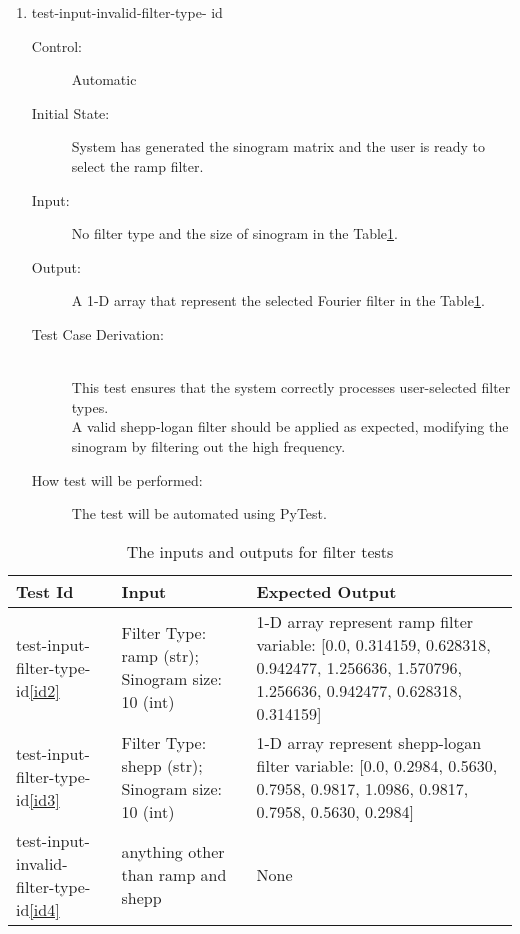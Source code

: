 \documentclass[12pt, titlepage]{article}
\newcounter{testnum}
\newcommand{\dthetestnum}{id\thetestnum}
\begin{document}
\begin{enumerate}
\item{test-input-invalid-filter-type- \label{id4} \dthetestnum}
\begin{description}
\item[Control:] Automatic


\item[Initial State:] System has generated the sinogram matrix and the user is
  ready to select the ramp filter.

\item[Input:] No filter type and the size of sinogram in the Table\ref{TableA}.

\item[Output:] A 1-D array that represent the selected Fourier filter in the Table\ref{TableA}.

\item[Test Case Derivation:] \hfill \\
  This test ensures that the system correctly processes
  user-selected filter types.\\
  A valid shepp-logan filter should be applied as expected, modifying the
  sinogram by filtering out the high frequency.

\item[How test will be performed:] The test will be automated using PyTest.
\end{description}
\end{enumerate}

\begin{table}[H]
  \centering
  \begin{tabularx}{\linewidth}{|X|X|X|}
    \hline
    Test Id                                  & Input                                            & Expected Output                                                                                                                             \\
    \hline
    test-input-filter-type-id\ref{id2}         & Filter Type: ramp (str); Sinogram size: 10 (int)  & 1-D array represent ramp filter variable: [0.0, 0.314159, 0.628318, 0.942477, 1.256636, 1.570796, 1.256636, 0.942477, 0.628318, 0.314159] \\ \hline
    test-input-filter-type-id\ref{id3}         & Filter Type: shepp (str); Sinogram size: 10 (int) & 1-D array represent shepp-logan filter variable: [0.0, 0.2984, 0.5630, 0.7958, 0.9817, 1.0986, 0.9817, 0.7958, 0.5630, 0.2984]            \\ \hline
    test-input-invalid-filter-type-id\ref{id4} & anything other than ramp and shepp               & None                                                                                                                                        \\ \hline
  \end{tabularx}
  \caption{The inputs and outputs for filter tests}
  \label{TableA}
\end{table}
\end{document}
